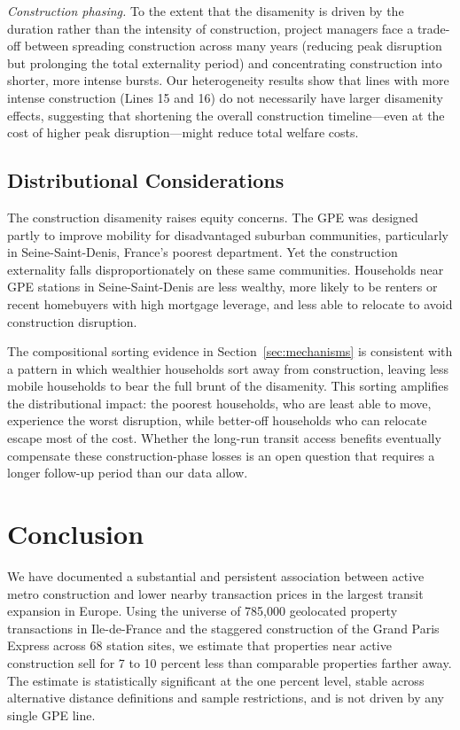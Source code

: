\documentclass[12pt]{article}
\begin{document}
\textit{Construction phasing.} To the extent that the disamenity is driven by the duration rather than the intensity of construction, project managers face a trade-off between spreading construction across many years (reducing peak disruption but prolonging the total externality period) and concentrating construction into shorter, more intense bursts. Our heterogeneity results show that lines with more intense construction (Lines 15 and 16) do not necessarily have larger disamenity effects, suggesting that shortening the overall construction timeline---even at the cost of higher peak disruption---might reduce total welfare costs.

\subsection{Distributional Considerations}

The construction disamenity raises equity concerns. The GPE was designed partly to improve mobility for disadvantaged suburban communities, particularly in Seine-Saint-Denis, France's poorest department. Yet the construction externality falls disproportionately on these same communities. Households near GPE stations in Seine-Saint-Denis are less wealthy, more likely to be renters or recent homebuyers with high mortgage leverage, and less able to relocate to avoid construction disruption.

The compositional sorting evidence in Section~\ref{sec:mechanisms} is consistent with a pattern in which wealthier households sort away from construction, leaving less mobile households to bear the full brunt of the disamenity. This sorting amplifies the distributional impact: the poorest households, who are least able to move, experience the worst disruption, while better-off households who can relocate escape most of the cost. Whether the long-run transit access benefits eventually compensate these construction-phase losses is an open question that requires a longer follow-up period than our data allow.


\section{Conclusion}
\label{sec:conclusion}

We have documented a substantial and persistent association between active metro construction and lower nearby transaction prices in the largest transit expansion in Europe. Using the universe of 785,000 geolocated property transactions in Ile-de-France and the staggered construction of the Grand Paris Express across 68 station sites, we estimate that properties near active construction sell for 7 to 10 percent less than comparable properties farther away. The estimate is statistically significant at the one percent level, stable across alternative distance definitions and sample restrictions, and is not driven by any single GPE line.
\end{document}
